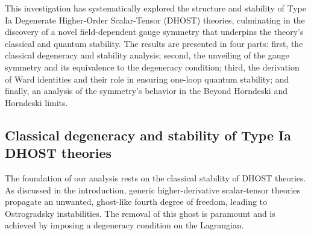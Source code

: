 \documentclass[twocolumn]{aastex631}
\begin{document}
\label{sec:results}
This investigation has systematically explored the structure and stability of Type Ia Degenerate Higher-Order Scalar-Tensor (DHOST) theories, culminating in the discovery of a novel field-dependent gauge symmetry that underpins the theory's classical and quantum stability. The results are presented in four parts: first, the classical degeneracy and stability analysis; second, the unveiling of the gauge symmetry and its equivalence to the degeneracy condition; third, the derivation of Ward identities and their role in ensuring one-loop quantum stability; and finally, an analysis of the symmetry's behavior in the Beyond Horndeski and Horndeski limits.

\subsection{Classical degeneracy and stability of Type Ia DHOST theories}
The foundation of our analysis rests on the classical stability of DHOST theories. As discussed in the introduction, generic higher-derivative scalar-tensor theories propagate an unwanted, ghost-like fourth degree of freedom, leading to Ostrogradsky instabilities. The removal of this ghost is paramount and is achieved by imposing a degeneracy condition on the Lagrangian.
\end{document}
